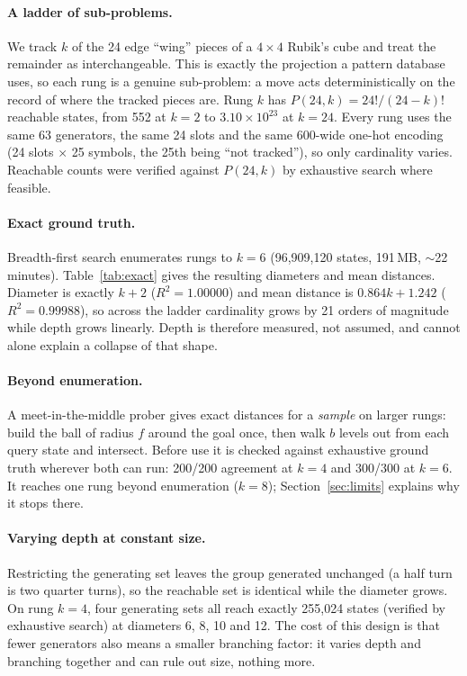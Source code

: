 \documentclass{article}
\begin{document}
\paragraph{A ladder of sub-problems.} We track $k$ of the 24 edge ``wing'' pieces
of a $4\times4$ Rubik's cube and treat the remainder as interchangeable. This is
exactly the projection a pattern database uses, so each rung is a genuine
sub-problem: a move acts deterministically on the record of where the tracked
pieces are. Rung $k$ has $P(24,k) = 24!/(24-k)!$ reachable states, from 552 at
$k=2$ to $3.10\times10^{23}$ at $k=24$. Every rung uses the same 63 generators,
the same 24 slots and the same 600-wide one-hot encoding (24 slots $\times$ 25
symbols, the 25th being ``not tracked''), so only cardinality varies. Reachable
counts were verified against $P(24,k)$ by exhaustive search where feasible.

\paragraph{Exact ground truth.} Breadth-first search enumerates rungs to $k=6$
(96{,}909{,}120 states, 191\,MB, $\sim$22 minutes). Table~\ref{tab:exact} gives
the resulting diameters and mean distances. Diameter is exactly $k+2$
($R^2 = 1.00000$) and mean distance is $0.864k + 1.242$ ($R^2 = 0.99988$), so
across the ladder cardinality grows by 21 orders of magnitude while depth grows
linearly. Depth is therefore measured, not assumed, and cannot alone explain a
collapse of that shape.

\begin{table}[t]\centering
\caption{Exhaustive ground truth. Diameter is exactly $k+2$.}
\label{tab:exact}\end{table}

\paragraph{Beyond enumeration.} A meet-in-the-middle prober gives exact distances
for a \emph{sample} on larger rungs: build the ball of radius $f$ around the goal
once, then walk $b$ levels out from each query state and intersect. Before use it
is checked against exhaustive ground truth wherever both can run: 200/200
agreement at $k=4$ and 300/300 at $k=6$. It reaches one rung beyond enumeration
($k=8$); Section~\ref{sec:limits} explains why it stops there.

\paragraph{Varying depth at constant size.} Restricting the generating set leaves
the group generated unchanged (a half turn is two quarter turns), so the
reachable set is identical while the diameter grows. On rung $k=4$, four
generating sets all reach exactly 255{,}024 states (verified by exhaustive search)
at diameters 6, 8, 10 and 12. The cost of this design is that fewer generators
also means a smaller branching factor: it varies depth and branching together and
can rule out size, nothing more.
\end{document}
